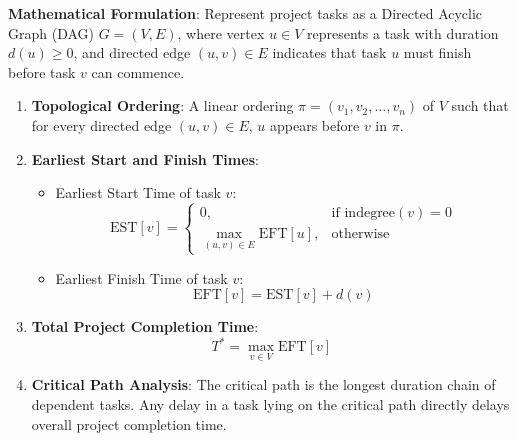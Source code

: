\documentclass[12pt]{article}
\begin{document}
\textbf{Mathematical Formulation}:
Represent project tasks as a Directed Acyclic Graph (DAG) $G = (V, E)$, where vertex $u \in V$ represents a task with duration $d(u) \ge 0$, and directed edge $(u, v) \in E$ indicates that task $u$ must finish before task $v$ can commence.
\begin{enumerate}
    \item \textbf{Topological Ordering}: A linear ordering $\pi = (v_1, v_2, \dots, v_n)$ of $V$ such that for every directed edge $(u, v) \in E$, $u$ appears before $v$ in $\pi$.
    \item \textbf{Earliest Start and Finish Times}:
    \begin{itemize}
        \item Earliest Start Time of task $v$:
        \[
        \text{EST}[v] = \begin{cases}
        0, & \text{if } \text{indegree}(v) = 0 \\
        \max_{(u, v) \in E} \text{EFT}[u], & \text{otherwise}
        \end{cases}
        \]
        \item Earliest Finish Time of task $v$:
        \[
        \text{EFT}[v] = \text{EST}[v] + d(v)
        \]
    \end{itemize}
    \item \textbf{Total Project Completion Time}:
    \[
    T^* = \max_{v \in V} \text{EFT}[v]
    \]
    \item \textbf{Critical Path Analysis}: The critical path is the longest duration chain of dependent tasks. Any delay in a task lying on the critical path directly delays overall project completion time.
\end{enumerate}
\end{document}
